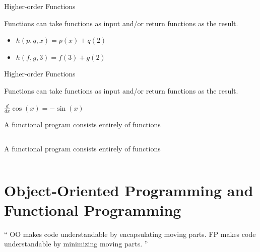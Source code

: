 \documentclass{beamer}
\begin{document}
\begin{frame}{Higher-order Functions}

  {\Large Functions can take functions as input and/or return
    functions as the result.}

  \vskip5mm

  \begin{itemize}[<+->]
  \item {\Huge $h(p, q, x) = p(x) + q(2)$}
  \item {\Huge $h(f, g, 3) = f(3) + g(2)$}
  \end{itemize}

\end{frame}

\begin{frame}{Higher-order Functions}

  {\Large Functions can take functions as input and/or return
    functions as the result.}

  \vskip5mm

  {\Huge $\frac{d}{dx}\cos(x) = -\sin(x)$}

\end{frame}

\begin{frame}{A functional program consists entirely of functions}

  \inputminted[firstline=3]{python}{code/justfunctions.py}

\end{frame}

\begin{frame}{A functional program consists entirely of functions}

  \inputminted{haskell}{code/justfunctions.hs}

\end{frame}

\section{Object-Oriented Programming and Functional Programming}

\begin{frame}

  \begin{exampleblock}{}
    {\Large ``
      OO makes code understandable by encapsulating
      moving parts.
      FP makes code understandable by minimizing moving
      parts.
      ''}
    \vskip5mm
    \hspace*{}
  \end{exampleblock}

\end{frame}
\end{document}
